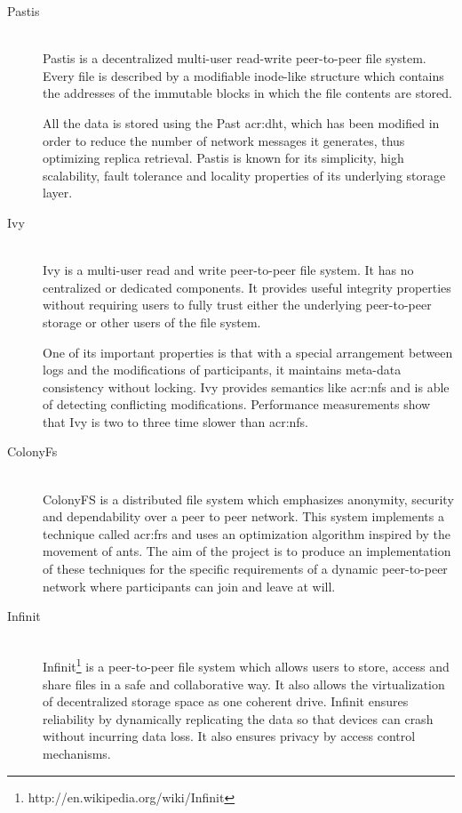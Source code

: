 \begin{description}
	\item[Pastis]\-\\
	Pastis \cite{Busca:2005gt} is a decentralized multi-user read-write peer-to-peer file system. Every file is described by
a modifiable inode-like structure which contains the addresses of the immutable blocks in which the file contents are stored.

All the data is stored using the Past \gls{acr:dht}, which has been modified in order to reduce the number of network messages it generates, thus optimizing replica retrieval. Pastis is known for its simplicity, high scalability, fault tolerance and locality properties of its underlying storage layer.

	\item[Ivy]\-\\
	Ivy \cite{Muthitacharoen:2002iv} is a multi-user read and write peer-to-peer file system. It has no centralized or dedicated components. It provides useful integrity properties without requiring users to fully trust either the underlying peer-to-peer storage or other users of the file system.
	
	One of its important properties is that with a special arrangement between logs and the modifications of participants, it maintains meta-data consistency without locking. Ivy provides semantics like \gls{acr:nfs} and is able of detecting conflicting modifications. Performance measurements show that Ivy is two to three time slower than \gls{acr:nfs}.
	\item[ColonyFs]\-\\
	ColonyFS \cite{Colony:2009fs} is a distributed file system which emphasizes anonymity, security and dependability over a peer to peer network. This system implements a technique called \gls{acr:frs} and uses an optimization algorithm inspired by the movement of ants. The aim of the project is to produce an implementation of these techniques for the specific requirements of a dynamic peer-to-peer network where participants can join and leave at will.
	\item[Infinit]\-\\
	Infinit\footnote{http://en.wikipedia.org/wiki/Infinit} is a peer-to-peer file system which allows users to store, access and share files in a safe and collaborative way. It also allows the virtualization of decentralized storage space as one coherent drive. Infinit ensures reliability by dynamically replicating the data so that devices can crash without incurring data loss. It also ensures privacy by access control mechanisms.
	

\end{description}
